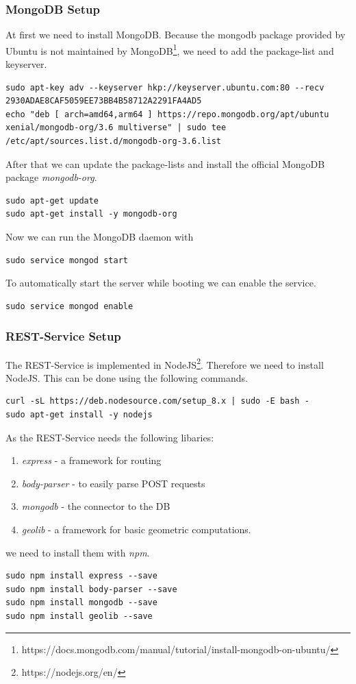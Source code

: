 \subsubsection{MongoDB Setup}
At first we need to install MongoDB. Because the mongodb package provided by Ubuntu is not maintained by MongoDB\footnote{https://docs.mongodb.com/manual/tutorial/install-mongodb-on-ubuntu/}, we need to add the package-list and keyserver.
\begin{lstlisting}
sudo apt-key adv --keyserver hkp://keyserver.ubuntu.com:80 --recv 2930ADAE8CAF5059EE73BB4B58712A2291FA4AD5
echo "deb [ arch=amd64,arm64 ] https://repo.mongodb.org/apt/ubuntu xenial/mongodb-org/3.6 multiverse" | sudo tee /etc/apt/sources.list.d/mongodb-org-3.6.list
\end{lstlisting}

After that we can update the package-lists and install the official MongoDB package \textit{mongodb-org}.
\begin{lstlisting}
sudo apt-get update
sudo apt-get install -y mongodb-org
\end{lstlisting}

Now we can run the MongoDB daemon with
\begin{lstlisting}
sudo service mongod start
\end{lstlisting}

To automatically start the server while booting we can enable the service.
\begin{lstlisting}
sudo service mongod enable
\end{lstlisting}

\subsubsection{REST-Service Setup}
\label{sec:REST-Service}
The REST-Service is implemented in NodeJS\footnote{https://nodejs.org/en/}. Therefore we need to install NodeJS. This can be done using the following commands.
\begin{lstlisting}
curl -sL https://deb.nodesource.com/setup_8.x | sudo -E bash -
sudo apt-get install -y nodejs
\end{lstlisting}

As the REST-Service needs the following libaries:
\begin{enumerate}
	\item \textit{express} - a framework for routing
	\item \textit{body-parser} - to easily parse POST requests
	\item \textit{mongodb} - the connector to the DB
	\item \textit{geolib} - a framework for basic geometric computations.
\end{enumerate}
we need to install them with \textit{npm}.
\begin{lstlisting}
sudo npm install express --save
sudo npm install body-parser --save
sudo npm install mongodb --save
sudo npm install geolib --save
\end{lstlisting}

